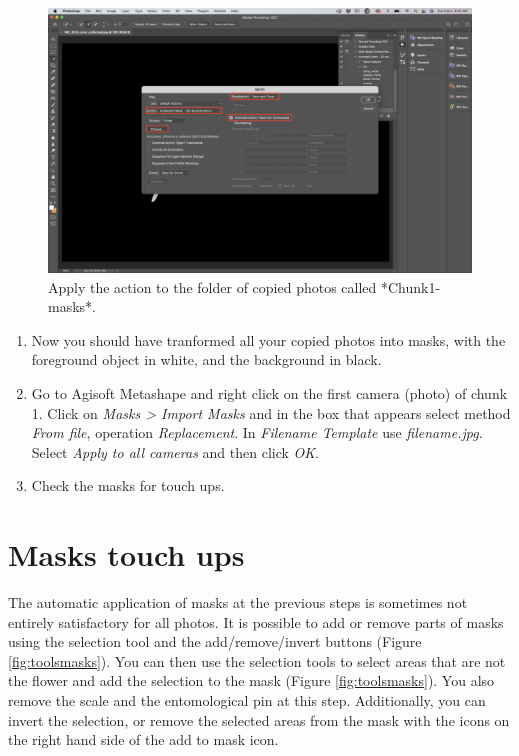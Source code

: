 \documentclass[
]{book}
\begin{document}
\begin{figure}

{\centering \includegraphics[width=1\linewidth]{Figures/mask_4} 

}

\caption{Apply the action to the folder of copied photos called *Chunk1-masks*.}\label{fig:mask4}
\end{figure}

\begin{enumerate}
\def\labelenumi{\arabic{enumi}.}
\setcounter{enumi}{4}
\item
  Now you should have tranformed all your copied photos into masks,
  with the foreground object in white, and the background in black.
\item
  Go to Agisoft Metashape and right click on the first camera (photo)
  of chunk 1. Click on \emph{Masks \textgreater{} Import Masks} and in the box that
  appears select method \emph{From file}, operation \emph{Replacement}. In
  \emph{Filename Template} use \emph{filename.jpg}. Select \emph{Apply to all
  cameras} and then click \emph{OK}.
\item
  Check the masks for touch ups.
\end{enumerate}

\hypertarget{masks-touch-ups}{%
\section{Masks touch ups}\label{masks-touch-ups}}

The automatic application of masks at the previous steps is sometimes
not entirely satisfactory for all photos. It is possible to add or
remove parts of masks using the selection tool and the add/remove/invert
buttons (Figure \ref{fig:toolsmasks}). You can then use the selection tools to
select areas that are not the flower and add the selection to the mask
(Figure \ref{fig:toolsmasks}). You also remove the scale and the
entomological pin at this step. Additionally, you can invert the
selection, or remove the selected areas from the mask with the icons on
the right hand side of the add to mask icon.
\end{document}
